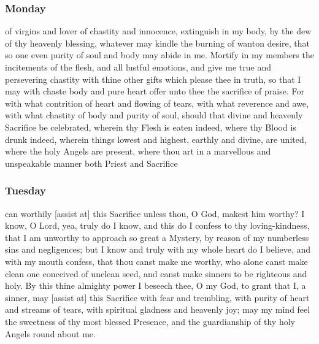 \subsubsection{Monday}
 of virgins and lover of chastity and innocence, extinguish in my body, by the dew of thy heavenly blessing, whatever may kindle the burning of wanton desire, that so one even purity of soul and body may abide in me. Mortify in my members the incitements of the flesh, and all lustful emotions, and give me true and persevering chastity with thine other gifts which please thee in truth, so that I may with chaste body and pure heart offer unto thee the sacrifice of praise. For with what contrition of heart and flowing of tears, with what reverence and awe, with what chastity of body and purity of soul, should that divine and heavenly Sacrifice be celebrated, wherein thy Flesh is eaten indeed, where thy Blood is drunk indeed, wherein things lowest and highest, earthly and divine, are united, where the holy Angels are present, where thou art in a marvellous and unspeakable manner both Priest and Sacrifice 
\subsubsection{Tuesday}
 can worthily [assist at] this Sacrifice unless thou, O God, makest him worthy? I know, O Lord, yea, truly do I know, and this do I confess to thy loving-kindness, that I am unworthy to approach so great a Mystery, by reason of my numberless sins and negligences; but I know and truly with my whole heart do I believe, and with my mouth confess, that thou canst make me worthy, who alone canst make clean one conceived of unclean seed, and canst make sinners to be righteous and holy. By this thine almighty power I beseech thee, O my God, to grant that I, a sinner, may [assist at] this Sacrifice with fear and trembling, with purity of heart and streams of tears, with spiritual gladness and heavenly joy; may my mind feel the sweetness of thy most blessed Presence, and the guardianship of thy holy Angels round about me.

